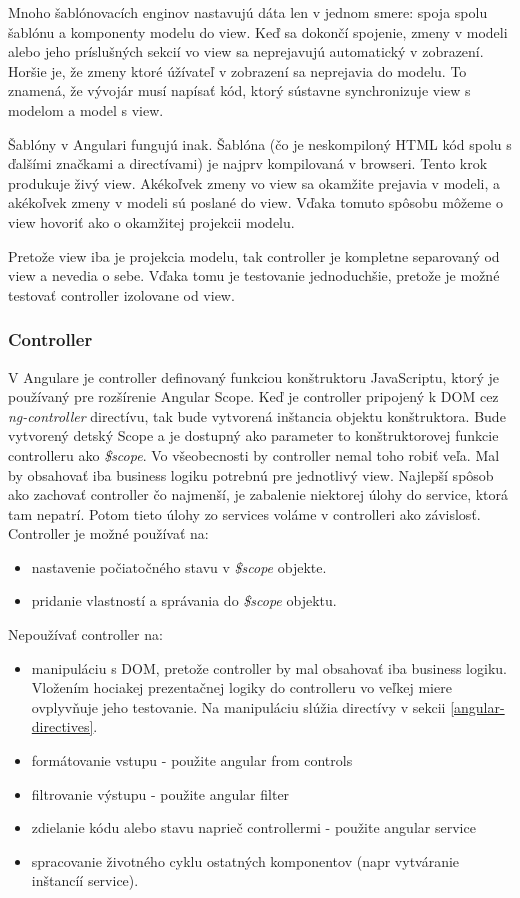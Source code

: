 Mnoho šablónovacích enginov nastavujú dáta len v jednom smere: spoja spolu šablónu a komponenty modelu do view. Keď sa dokončí spojenie, zmeny v modeli alebo jeho príslušných sekcií vo view sa neprejavujú automatický v zobrazení. Horšie je, že zmeny ktoré úžívateľ v zobrazení sa neprejavia do modelu. To znamená, že vývojár musí napísať kód, ktorý sústavne synchronizuje view s modelom a model s view.

Šablóny v Angulari fungujú inak. Šablóna (čo je neskompiloný HTML kód spolu s ďalšími značkami a directívami) je najprv kompilovaná v browseri. Tento krok produkuje živý view. Akékoľvek zmeny vo view sa okamžite prejavia v modeli, a akékoľvek zmeny v modeli sú poslané do view. Vďaka tomuto spôsobu môžeme o view hovoriť ako o okamžitej projekcii modelu.

Pretože view iba je projekcia modelu, tak controller je kompletne separovaný od view a nevedia o sebe. Vďaka tomu je testovanie jednoduchšie, pretože je možné testovať controller izolovane od view.

\subsubsection{Controller}
V Angulare je controller definovaný funkciou konštruktoru JavaScriptu, ktorý je používaný pre rozšírenie Angular Scope.
Keď je controller pripojený k DOM cez \textit{ng-controller} directívu, tak bude vytvorená inštancia objektu konštruktora. Bude vytvorený detský Scope a je dostupný ako parameter to konštruktorovej funkcie controlleru ako \textit{\$scope}.
Vo všeobecnosti by controller nemal toho robiť veľa. Mal by obsahovať iba business logiku potrebnú pre jednotlivý view. Najlepší spôsob ako zachovať controller čo najmenší, je zabalenie niektorej úlohy do service, ktorá tam nepatrí. Potom tieto úlohy zo services voláme v controlleri ako závislosť.\\

Controller je možné používať na:
\begin{itemize}
\item nastavenie počiatočného stavu v \textit{\$scope} objekte.
\item pridanie vlastností a správania do \textit{\$scope} objektu.
\end{itemize}

Nepoužívať controller na:
\begin{itemize}
\item manipuláciu s DOM, pretože controller by mal obsahovať iba business logiku. Vložením hociakej prezentačnej logiky do controlleru vo veľkej miere ovplyvňuje jeho testovanie. Na manipuláciu slúžia directívy v sekcii \ref{angular-directives}.
\item formátovanie vstupu - použite angular from controls
\item filtrovanie výstupu - použite angular filter
\item zdielanie kódu alebo stavu naprieč controllermi - použite angular service
\item spracovanie životného cyklu ostatných komponentov (napr vytváranie inštancíí service).
\end{itemize}

